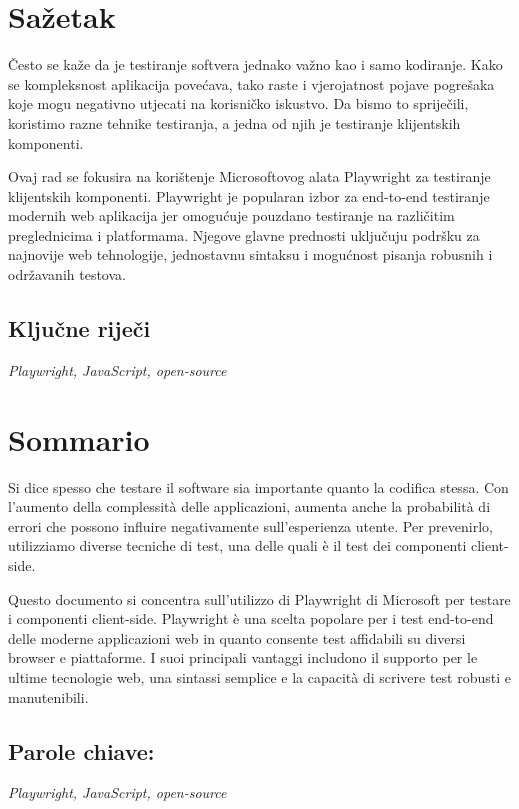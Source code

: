 \section*{Sažetak}\label{sazetak_hr}
Često se kaže da je testiranje softvera jednako važno kao i samo kodiranje. 
Kako se kompleksnost aplikacija povećava, tako raste i vjerojatnost pojave pogrešaka koje mogu negativno utjecati na korisničko iskustvo. 
Da bismo to spriječili, koristimo razne tehnike testiranja, a jedna od njih je testiranje klijentskih komponenti.

Ovaj rad se fokusira na korištenje Microsoftovog alata Playwright za testiranje klijentskih komponenti. 
Playwright je popularan izbor za end-to-end testiranje modernih web aplikacija jer omogućuje pouzdano testiranje na različitim preglednicima i platformama. 
Njegove glavne prednosti uključuju podršku za najnovije web tehnologije, jednostavnu sintaksu i mogućnost pisanja robusnih i održavanih testova.

\subsection*{Ključne riječi}\label{kw_hr}
\textit{Playwright, JavaScript, open-source}

\section*{Sommario}\label{sazetak_it}
Si dice spesso che testare il software sia importante quanto la codifica stessa.
Con l'aumento della complessità delle applicazioni, aumenta anche la probabilità di errori che possono influire negativamente sull'esperienza utente.
Per prevenirlo, utilizziamo diverse tecniche di test, una delle quali è il test dei componenti client-side.

Questo documento si concentra sull'utilizzo di Playwright di Microsoft per testare i componenti client-side.
Playwright è una scelta popolare per i test end-to-end delle moderne applicazioni web in quanto consente test affidabili su diversi browser e piattaforme.
I suoi principali vantaggi includono il supporto per le ultime tecnologie web, una sintassi semplice e la capacità di scrivere test robusti e manutenibili.

\subsection*{Parole chiave:}\label{kw_it}
\textit{Playwright, JavaScript, open-source}

